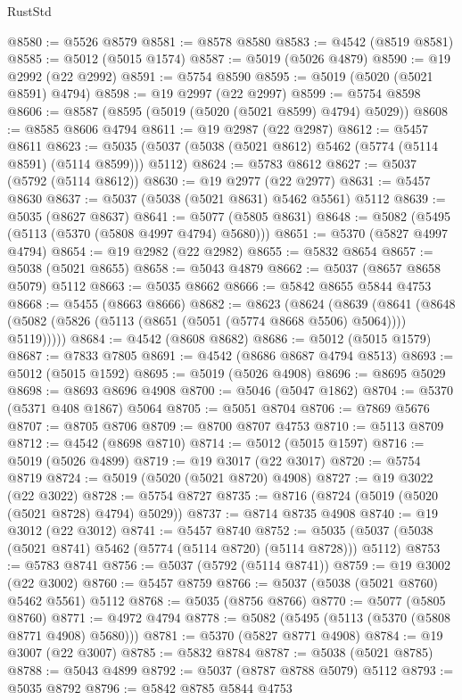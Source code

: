 \begin{lexlean}{RustStd}
\begin{coremodule}
@8580 := @5526 @8579
@8581 := @8578 @8580
@8583 := @4542 (@8519 @8581)
@8585 := @5012 (@5015 @1574)
@8587 := @5019 (@5026 @4879)
@8590 := @19 @2992 (@22 @2992)
@8591 := @5754 @8590
@8595 := @5019 (@5020 (@5021 @8591) @4794)
@8598 := @19 @2997 (@22 @2997)
@8599 := @5754 @8598
@8606 := @8587 (@8595 (@5019 (@5020 (@5021 @8599) @4794) @5029))
@8608 := @8585 @8606 @4794
@8611 := @19 @2987 (@22 @2987)
@8612 := @5457 @8611
@8623 := @5035 (@5037 (@5038 (@5021 @8612) @5462 (@5774 (@5114 @8591) (@5114 @8599))) @5112)
@8624 := @5783 @8612
@8627 := @5037 (@5792 (@5114 @8612))
@8630 := @19 @2977 (@22 @2977)
@8631 := @5457 @8630
@8637 := @5037 (@5038 (@5021 @8631) @5462 @5561) @5112
@8639 := @5035 (@8627 @8637)
@8641 := @5077 (@5805 @8631)
@8648 := @5082 (@5495 (@5113 (@5370 (@5808 @4997 @4794) @5680)))
@8651 := @5370 (@5827 @4997 @4794)
@8654 := @19 @2982 (@22 @2982)
@8655 := @5832 @8654
@8657 := @5038 (@5021 @8655)
@8658 := @5043 @4879
@8662 := @5037 (@8657 @8658 @5079) @5112
@8663 := @5035 @8662
@8666 := @5842 @8655 @5844 @4753
@8668 := @5455 (@8663 @8666)
@8682 := @8623
    (@8624
      (@8639
        (@8641 (@8648 (@5082 (@5826 (@5113 (@8651 (@5051 (@5774 @8668 @5506) @5064)))) @5119)))))
@8684 := @4542 (@8608 @8682)
@8686 := @5012 (@5015 @1579)
@8687 := @7833 @7805
@8691 := @4542 (@8686 @8687 @4794 @8513)
@8693 := @5012 (@5015 @1592)
@8695 := @5019 (@5026 @4908)
@8696 := @8695 @5029
@8698 := @8693 @8696 @4908
@8700 := @5046 (@5047 @1862)
@8704 := @5370 (@5371 @408 @1867) @5064
@8705 := @5051 @8704
@8706 := @7869 @5676
@8707 := @8705 @8706
@8709 := @8700 @8707 @4753
@8710 := @5113 @8709
@8712 := @4542 (@8698 @8710)
@8714 := @5012 (@5015 @1597)
@8716 := @5019 (@5026 @4899)
@8719 := @19 @3017 (@22 @3017)
@8720 := @5754 @8719
@8724 := @5019 (@5020 (@5021 @8720) @4908)
@8727 := @19 @3022 (@22 @3022)
@8728 := @5754 @8727
@8735 := @8716 (@8724 (@5019 (@5020 (@5021 @8728) @4794) @5029))
@8737 := @8714 @8735 @4908
@8740 := @19 @3012 (@22 @3012)
@8741 := @5457 @8740
@8752 := @5035 (@5037 (@5038 (@5021 @8741) @5462 (@5774 (@5114 @8720) (@5114 @8728))) @5112)
@8753 := @5783 @8741
@8756 := @5037 (@5792 (@5114 @8741))
@8759 := @19 @3002 (@22 @3002)
@8760 := @5457 @8759
@8766 := @5037 (@5038 (@5021 @8760) @5462 @5561) @5112
@8768 := @5035 (@8756 @8766)
@8770 := @5077 (@5805 @8760)
@8771 := @4972 @4794
@8778 := @5082 (@5495 (@5113 (@5370 (@5808 @8771 @4908) @5680)))
@8781 := @5370 (@5827 @8771 @4908)
@8784 := @19 @3007 (@22 @3007)
@8785 := @5832 @8784
@8787 := @5038 (@5021 @8785)
@8788 := @5043 @4899
@8792 := @5037 (@8787 @8788 @5079) @5112
@8793 := @5035 @8792
@8796 := @5842 @8785 @5844 @4753

\end{coremodule}
\end{lexlean}
